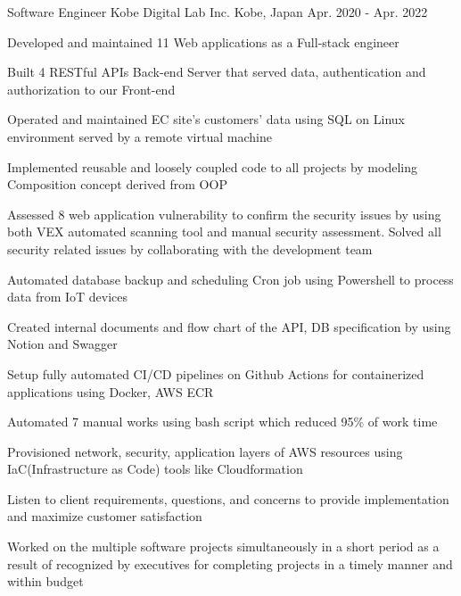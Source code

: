 \begin{cventries}
  \cventry
    {Software Engineer} %
    {Kobe Digital Lab Inc.} %
    {Kobe, Japan} %
    {Apr. 2020 - Apr. 2022} %
    {
      \begin{cvitems} %
        \item {Developed and maintained 11 Web applications as a Full-stack engineer}
        \item {Built 4 RESTful APIs Back-end Server that served data, authentication and authorization to our Front-end}
        \item {Operated and maintained EC site's customers' data using SQL on Linux environment served by a remote virtual machine}
        \item {Implemented reusable and loosely coupled code to all projects by modeling Composition concept derived from OOP}
        \item {Assessed 8 web application vulnerability to confirm the security issues by using both VEX automated scanning tool and manual security assessment. Solved all security related issues by collaborating with the development team}
        \item {Automated database backup and scheduling Cron job using Powershell to process data from IoT devices}
        \item {Created internal documents and flow chart of the API, DB specification by using Notion and Swagger}
        \item {Setup fully automated CI/CD pipelines on Github Actions for containerized applications using Docker, AWS ECR}
        \item {Automated 7 manual works using bash script which reduced 95\% of work time}
        \item {Provisioned network, security, application layers of AWS resources using IaC(Infrastructure as Code) tools like Cloudformation}
        \item {Listen to client requirements, questions, and concerns to provide implementation and maximize customer satisfaction}
        \item {Worked on the multiple software projects simultaneously in a short period as a result of recognized by executives for completing projects in a timely manner and within budget}
      \end{cvitems}
    }


\end{cventries}